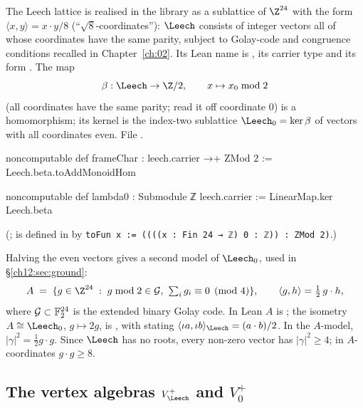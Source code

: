 The Leech lattice is realised in the library as a sublattice of $\Z^{24}$ with the form
$\langle x,y\rangle = x\cdot y/8$ (``$\sqrt 8$-coordinates''): $\Leech$ consists of integer vectors all
of whose coordinates have the same parity, subject to Golay-code and congruence conditions recalled in
Chapter~\ref{ch:02}.  Its Lean name is , its carrier type  and its form
.  The map
\begin{equation*}
  \beta : \Leech \to \Z/2,\qquad x\mapsto x_0 \bmod 2
\end{equation*}
(all coordinates have the same parity; read it off coordinate $0$) is a homomorphism; its kernel is the
index-two sublattice $\Leech_0=\ker\beta$ of vectors with all coordinates even.
File .
\begin{leancode}
noncomputable def frameChar : leech.carrier →+ ZMod 2 := Leech.beta.toAddMonoidHom

noncomputable def lambda0 : Submodule ℤ leech.carrier := LinearMap.ker Leech.beta
\end{leancode}
(;  is defined in
 by \texttt{toFun x := ((((x : Fin 24 → ℤ) 0 : ℤ)) : ZMod 2)}.)

Halving the even vectors gives a second model of $\Leech_0$, used in \S\ref{ch12:sec:ground}:
\begin{equation}\label{ch12:eq:Acoords}
  A \;=\; \{ g\in\Z^{24} \;:\; g\bmod 2\in\chtwelveG,\ \textstyle\sum_i g_i\equiv 0 \pmod 4\},
  \qquad \langle g,h\rangle = \tfrac12\, g\cdot h,
\end{equation}
where $\mathcal{G}\subset\mathbb F_2^{24}$ is the extended binary Golay code.  In Lean $A$ is
; the isometry $A\cong\Leech_0$, $g\mapsto 2g$, is , with
 stating $\langle\iota a,\iota b\rangle_\Leech=(a\cdot b)/2$.  In the
$A$-model, $|\gamma|^2=\tfrac12 g\cdot g$.  Since $\Leech$ has no roots, every non-zero vector has
$|\gamma|^2\ge4$; in $A$-coordinates $g\cdot g\ge 8$.

\subsection{The vertex algebras \texorpdfstring{$V_\Leech^+$}{V\_Λ⁺} and \texorpdfstring{$V_0^+$}{V₀⁺}}

